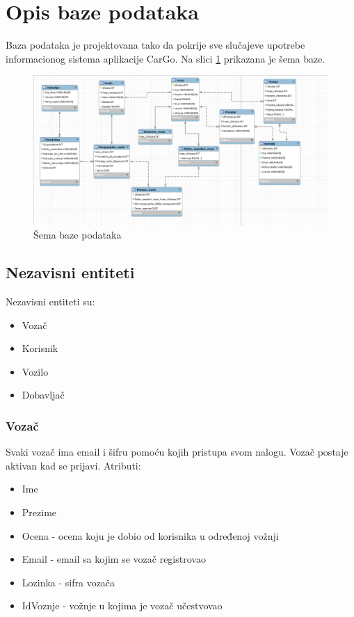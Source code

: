 \section{\bfseries Opis baze podataka}
Baza podataka je projektovana tako da pokrije sve slučajeve upotrebe informacionog sistema aplikacije CarGo. Na slici \ref{fig:bazaPodataka} prikazana je šema baze.

\begin{figure}[H]
\begin{center}
\includegraphics[width=\textwidth]{Slike/EER_dijagram_baze_podataka.png}
\end{center}
    \caption{Šema baze podataka}
\label{fig:bazaPodataka}
\end{figure}

\subsection{\textbf{Nezavisni entiteti}}
Nezavisni entiteti su:
\begin{itemize}
    \item Vozač
    \item Korisnik
    \item Vozilo
    \item Dobavljač
\end{itemize}

\subsubsection{\textbf{Vozač}}

Svaki vozač ima email i šifru pomoću kojih pristupa svom nalogu. Vozač postaje aktivan kad se prijavi. Atributi:
\begin{itemize}
    \item Ime
    \item Prezime
    \item Ocena - ocena koju je dobio od korisnika u određenoj vožnji
    \item Email - email sa kojim se vozač registrovao
    \item Lozinka - sifra vozača
    \item IdVoznje - vožnje u kojima je vozač učestvovao
\end{itemize}

